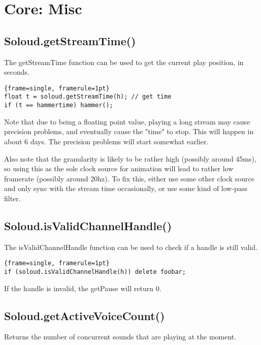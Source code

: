 
\chapter{Core: Misc}

\section{Soloud.getStreamTime()}

The getStreamTime function can be used to get the current play position, in seconds.

\begin{lstlisting}{frame=single, framerule=1pt}
float t = soloud.getStreamTime(h); // get time
if (t == hammertime) hammer();
\end{lstlisting}

Note that due to being a floating point value, playing a long stream may cause precision problems, and eventually cause the "time" to stop. This will happen in about 6 days. The precision problems will start somewhat earlier.

Also note that the granularity is likely to be rather high (possibly around 45ms), so using this as the sole clock source for animation will lead to rather low framerate (possibly around 20hz). To fix this, either use some other clock source and only sync with the stream time occasionally, or use some kind of low-pass filter.

\section{Soloud.isValidChannelHandle()}

The isValidChannelHandle function can be used to check if a handle is still valid.

\begin{lstlisting}{frame=single, framerule=1pt}
if (soloud.isValidChannelHandle(h)) delete foobar;
\end{lstlisting}

If the handle is invalid, the getPause will return 0.

\section{Soloud.getActiveVoiceCount()}

Returns the number of concurrent sounds that are playing at the moment.

